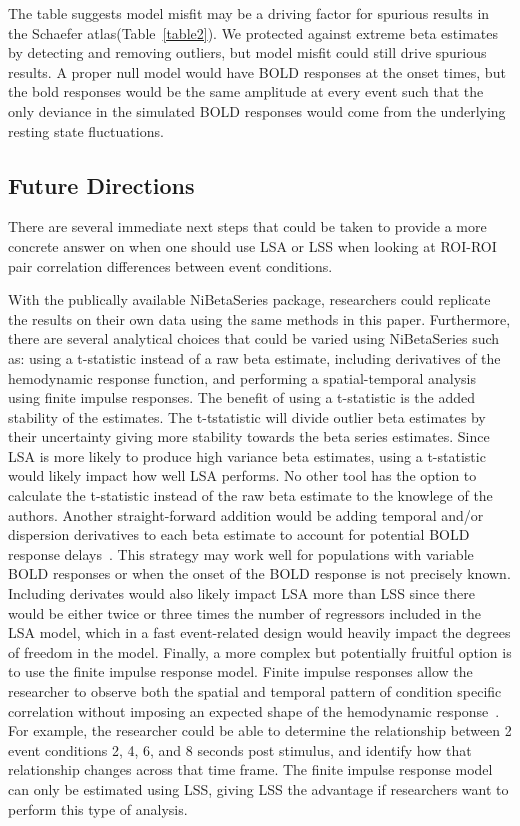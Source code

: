 \documentclass[phd,appendix,figures]{uithesis}
\begin{document}
The table suggests model misfit may be a driving factor for spurious results in the Schaefer atlas(Table~\ref{table2}).
We protected against extreme beta estimates by detecting and removing outliers, but model misfit
could still drive spurious results.
A proper null model would have BOLD responses at the onset times, but the bold responses
would be the same amplitude at every event such that the only deviance in the simulated
BOLD responses would come from the underlying resting state fluctuations.

\subsection*{Future Directions}

There are several immediate next steps that could be taken to provide a more concrete answer
on when one should use LSA or LSS when looking at ROI-ROI pair correlation differences between event
conditions.

With the publically available NiBetaSeries package, researchers could replicate the
results on their own data using the same methods in this paper.
Furthermore, there are several analytical choices that could be varied using NiBetaSeries such as:
using a t-statistic instead of a raw beta estimate, including derivatives of the hemodynamic response function,
and performing a spatial-temporal analysis using finite impulse responses.
The benefit of using a t-statistic is the added stability of the estimates.
The t-tstatistic will divide outlier beta estimates by their uncertainty giving more stability
towards the beta series estimates.
Since LSA is more likely to produce high variance beta estimates, using a t-statistic would likely impact
how well LSA performs.
No other tool has the option to calculate the t-statistic instead of the raw beta estimate to the knowlege
of the authors.
Another straight-forward addition would be adding temporal and/or dispersion derivatives to each beta
estimate to account for potential BOLD response delays~\cite{Calhoun2004,Gottlich2015}.
This strategy may work well for populations with variable BOLD responses or when the onset of the BOLD
response is not precisely known.
Including derivates would also likely impact LSA more than LSS since there would be either twice or
three times the number of regressors included in the LSA model, which in a fast event-related design
would heavily impact the degrees of freedom in the model.
Finally, a more complex but potentially fruitful option is to use the finite impulse response model.
Finite impulse responses allow the researcher to observe both the spatial and temporal pattern of
condition specific correlation without imposing an expected shape of the hemodynamic response~\cite{Turner2012a}.
For example, the researcher could be able to determine the relationship between 2 event conditions
2, 4, 6, and 8 seconds post stimulus, and identify how that relationship changes across
that time frame.
The finite impulse response model can only be estimated using LSS, giving LSS the advantage if researchers
want to perform this type of analysis.
\end{document}
